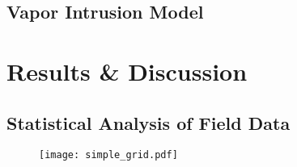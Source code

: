 \documentclass[journal=esthag,manuscript=article]{achemso}
\begin{document}
\subsection{Vapor Intrusion Model}



\section{Results \& Discussion}

\subsection{Statistical Analysis of Field Data}



\begin{figure}[!h]
		\centering
    \caption{ }
    \label{fig:pair_grid}
    \texttt{[image: simple\_grid.pdf]}
\end{figure}




\end{document}
